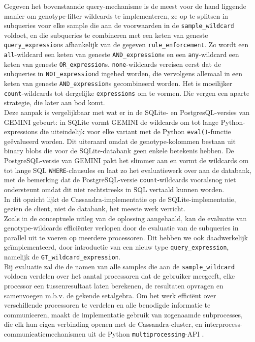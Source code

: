Gegeven het bovenstaande query-mechanisme is de meest voor de hand liggende manier om genotype-filter wildcards te implementeren, ze op te splitsen in subqueries voor elke sample die aan de voorwaarden in de \texttt{sample\_wildcard} voldoet, en die subqueries te combineren met een keten van geneste \texttt{query\_expression}s afhankelijk van de gegeven \texttt{rule\_enforcement}. Zo wordt een \texttt{all}-wildcard een keten van geneste \texttt{AND\_expression}s en een \texttt{any}-wildcard een keten van geneste \texttt{OR\_expression}s. \texttt{none}-wildcards vereisen eerst dat de subqueries in \texttt{NOT\_expression}d ingebed worden, die vervolgens allemaal in een keten van geneste \texttt{AND\_expression}s gecombineerd worden. Het is moeilijker \texttt{count}-wildcards tot dergelijke \texttt{expressions} om te vormen. Die vergen een aparte strategie, die later aan bod komt.\\
Deze aanpak is vergelijkbaar met wat er in de SQLite- en PostgresQL-versies van GEMINI gebeurt: in SQLite vormt GEMINI de wildcards om tot lange Python-expressions die uiteindelijk voor elke variant met de Python \texttt{eval()}-functie ge\"evalueerd worden. Dit uiteraard omdat de genotype-kolommen bestaan uit binary blobs die voor de SQLite-databank geen enkele betekenis hebben. De PostgreSQL-versie van GEMINI pakt het slimmer aan en vormt de wildcards om tot lange SQL \texttt{WHERE}-clausules en laat zo het evaluatiewerk over aan de databank, met de bemerking dat de PostgreSQL-versie \texttt{count}-wildcards vooralsnog niet ondersteunt omdat dit niet rechtstreeks in SQL vertaald kunnen worden.\\
In dit opzicht lijkt de Cassandra-implementatie op de SQLite-implementatie, gezien de client, niet de databank, het meeste werk verricht.\\

Zoals in de conceptuele uitleg van de oplossing aangehaald, kan de evaluatie van genotype-wildcards effici\"enter verlopen door de evaluatie van de subqueries in parallel uit te voeren op meerdere processoren. Dit hebben we ook daadwerkelijk ge\"implementeerd, door introductie van een nieuw type \texttt{query\_expression}, namelijk de \texttt{GT\_wildcard\_expression}.\\
Bij evaluatie zal die de namen van alle samples die aan de \texttt{sample\_wildcard} voldoen verdelen over het aantal processoren dat de gebruiker meegeeft, elke processor een tussenresultaat laten berekenen, de resultaten opvragen en samenvoegen m.b.v. de gekende setalgebra. Om het werk effici\"ent over verschillende processoren te verdelen en alle benodigde informatie te communiceren, maakt de implementatie gebruik van zogenaamde subprocesses, die elk hun eigen verbinding openen met de Cassandra-cluster, en interprocess-communicatiemechanismen uit de Python \texttt{multiprocessing}-API \cite{multiprocessing}.\\

